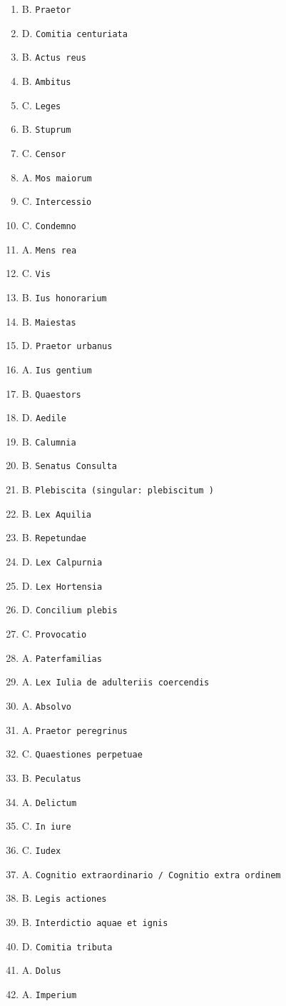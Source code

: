 \documentclass[11pt]{article}
\begin{document}
\begin{enumerate}
\item B. \texttt{Praetor}
\item D. \texttt{Comitia centuriata}
\item B. \texttt{Actus reus}
\item B. \texttt{Ambitus}
\item C. \texttt{Leges}
\item B. \texttt{Stuprum}
\item C. \texttt{Censor}
\item A. \texttt{Mos maiorum}
\item C. \texttt{Intercessio}
\item C. \texttt{Condemno}
\item A. \texttt{Mens rea}
\item C. \texttt{Vis}
\item B. \texttt{Ius honorarium}
\item B. \texttt{Maiestas}
\item D. \texttt{Praetor urbanus}
\item A. \texttt{Ius gentium}
\item B. \texttt{Quaestors}
\item D. \texttt{Aedile}
\item B. \texttt{Calumnia}
\item B. \texttt{Senatus Consulta}
\item B. \texttt{Plebiscita (singular: plebiscitum )}
\item B. \texttt{Lex Aquilia}
\item B. \texttt{Repetundae}
\item D. \texttt{Lex Calpurnia}
\item D. \texttt{Lex Hortensia}
\item D. \texttt{Concilium plebis}
\item C. \texttt{Provocatio}
\item A. \texttt{Paterfamilias}
\item A. \texttt{Lex Iulia de adulteriis coercendis}
\item A. \texttt{Absolvo}
\item A. \texttt{Praetor peregrinus}
\item C. \texttt{Quaestiones perpetuae}
\item B. \texttt{Peculatus}
\item A. \texttt{Delictum}
\item C. \texttt{In iure}
\item C. \texttt{Iudex}
\item A. \texttt{Cognitio extraordinario / Cognitio extra ordinem}
\item B. \texttt{Legis actiones}
\item B. \texttt{Interdictio aquae et ignis}
\item D. \texttt{Comitia tributa}
\item A. \texttt{Dolus}
\item A. \texttt{Imperium}
\end{enumerate}
\end{document}
